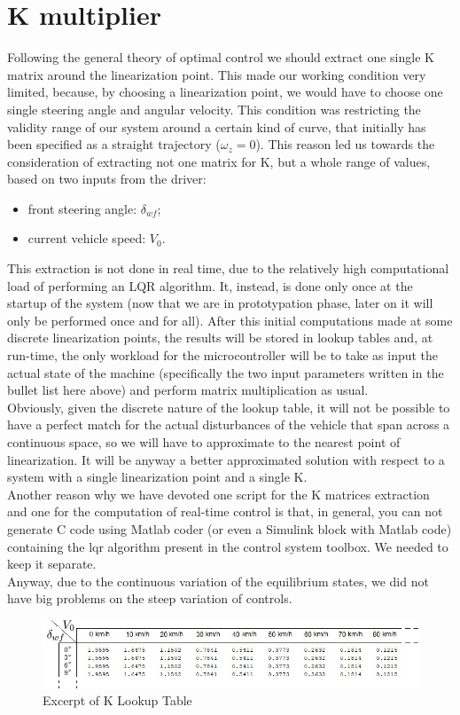 \section{K multiplier}
Following the general theory of optimal control we should extract one single K matrix around the linearization point. This made our working condition very limited, because, by choosing a linearization point, we would have to choose one single steering angle and angular velocity. This condition was restricting the validity range of our system around a certain kind of curve, that initially has been specified as a straight trajectory ($\omega_{z}=0$).
This reason led us towards the consideration of extracting not one matrix for K, but a whole range of values, based on two inputs from the driver:
\begin{itemize}
	\item front steering angle: $\delta_{wf}$;
	\item current vehicle speed: $V_0$.
\end{itemize}
This extraction is not done in real time, due to the relatively high computational load of performing an LQR algorithm. It, instead, is done only once at the startup of the system (now that we are in prototypation phase, later on it will only be performed once and for all). After this initial computations made at some discrete linearization points, the results will be stored in lookup tables and, at run-time, the only workload for the microcontroller will be to take as input the actual state of the machine (specifically the two input parameters written in the bullet list here above) and perform matrix multiplication as usual.\\
Obviously, given the discrete nature of the lookup table, it will not be possible to have a perfect match for the actual disturbances of the vehicle that span across a continuous space, so we will have to approximate to the nearest point of linearization. It will be anyway a better approximated solution with respect to a system with a single linearization point and a single K.\\
Another reason why we have devoted one script for the K matrices extraction and one for the computation of real-time control is that, in general, you can not generate C code using Matlab coder (or even a Simulink block with Matlab code) containing the lqr algorithm present in the control system toolbox. We needed to keep it separate.\\
Anyway, due to the continuous variation of the equilibrium states, we did not have big problems on the steep variation of controls.
\begin{figure}[!h]
\includegraphics[width=\linewidth]{../Images/KLut.jpg}\caption{Excerpt of K Lookup Table}
\end{figure}
